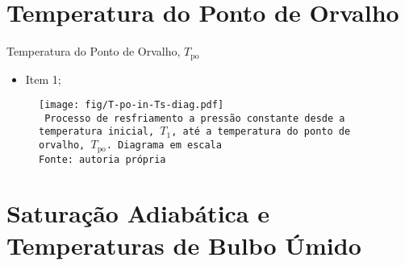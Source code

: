 \section{Temperatura do Ponto de Orvalho}

    \begin{frame}{Temperatura do Ponto de Orvalho, $T_{\mathrm{po}}$}\vspace*{-2em}
        \begin{itemize}
            \item<1-> Item 1;
        \end{itemize}
    \end{frame}

    \begin{frame}\vspace*{-2em}
        \begin{center}
            \begin{figure}
                \fontsize{5.0}{5}\selectfont
                \texttt{[image: fig/T-po-in-Ts-diag.pdf]}
                \\\vspace*{-0.0em}\texttt{%
                    Processo de resfriamento a pressão constante desde a temperatura inicial,
                    $T_1$, até a temperatura do ponto de orvalho, $T_{\mathrm{po}}$. Diagrama em
                    escala \\
                    Fonte: autoria própria
                }
            \end{figure}
        \end{center}
    \end{frame}

\section{Saturação Adiabática e Temperaturas de Bulbo Úmido}

